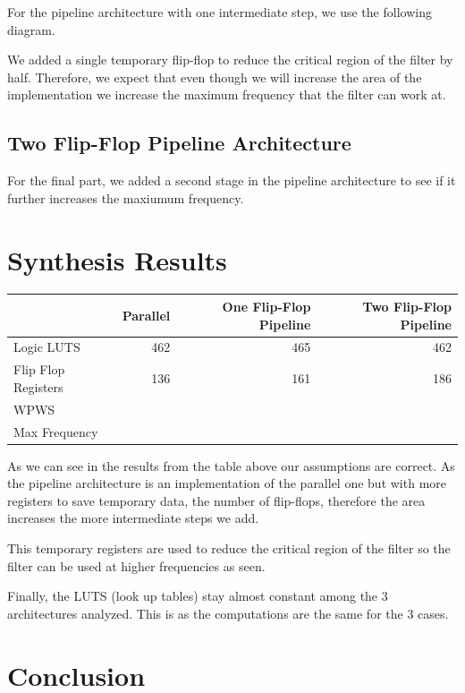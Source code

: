\documentclass[a4paper, 12pt]{article}
\begin{document}
For the pipeline architecture with one intermediate step, we use the following diagram.

We added a single temporary flip-flop to reduce the critical region of the filter by half. Therefore, we expect that even though we will increase the area of the implementation we increase the maximum frequency that the filter can work at.
\subsection{Two Flip-Flop Pipeline Architecture}
\label{sec:orgd61567e}

For the final part, we added a second stage in the pipeline architecture to see if it further increases the maxiumum frequency.
\section{Synthesis Results}
\label{sec:org6b9474c}

\begin{center}
\begin{tabular}{lrrr}
 & Parallel & One Flip-Flop Pipeline & Two Flip-Flop Pipeline\\
\hline
Logic LUTS & 462 & 465 & 462\\
Flip Flop Registers & 136 & 161 & 186\\
WPWS &  &  & \\
Max Frequency &  &  & \\
\end{tabular}
\end{center}

As we can see in the results from the table above our assumptions are correct. As the pipeline architecture is an implementation of the parallel one but with more registers to save temporary data, the number of flip-flops, therefore the area increases the more intermediate steps we add.

This temporary registers are used to reduce the critical region of the filter so the filter can be used at higher frequencies as seen.

Finally, the LUTS (look up tables) stay almost constant among the 3 architectures analyzed. This is as the computations are the same for the 3 cases.
\section{Conclusion}
\label{sec:org165bd0a}
\end{document}
